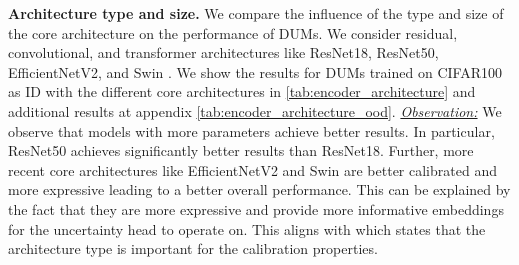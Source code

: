 \textbf{Architecture type and size.} We compare the influence of the type and size of the core architecture on the performance of DUMs. We consider residual, convolutional, and transformer architectures like ResNet18, ResNet50, EfficientNetV2, and Swin \citep{resnet, tan2021effcientnet, liu2021swin}. We show the results for DUMs trained on CIFAR100 as ID with the different core architectures in \cref{tab:encoder_architecture} and additional results at appendix \cref{tab:encoder_architecture_ood}. \underline{\textit{Observation:}} We observe that models with more parameters achieve better results. In particular, ResNet50 achieves significantly better results than ResNet18. Further, more recent core architectures like EfficientNetV2 and Swin are better calibrated and more expressive leading to a better overall performance. This can be explained by the fact that they are more expressive and provide more informative embeddings for the uncertainty head to operate on. This aligns with \citet{minderer2021revisiting} which states that the architecture type is important for the calibration properties. 



